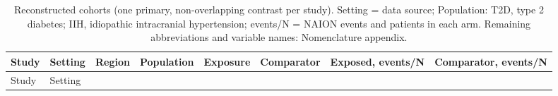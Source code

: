 \documentclass[
  11pt,
]{article}
\begin{document}
\begin{longtable}[]{@{}
  >{\raggedright\arraybackslash}p{}
  >{\raggedright\arraybackslash}p{}
  >{\raggedright\arraybackslash}p{}
  >{\raggedright\arraybackslash}p{}
  >{\raggedright\arraybackslash}p{}
  >{\raggedright\arraybackslash}p{}
  >{\raggedright\arraybackslash}p{}
  >{\raggedright\arraybackslash}p{}@{}}
\caption{Reconstructed cohorts (one primary, non-overlapping contrast
per study). Setting = data source; Population: T2D, type 2 diabetes;
IIH, idiopathic intracranial hypertension; events/N = NAION events and
patients in each arm. Remaining abbreviations and variable names:
Nomenclature appendix.}\tabularnewline
\toprule\noalign{}
\begin{minipage}[b]{\linewidth}\raggedright
Study
\end{minipage} & \begin{minipage}[b]{\linewidth}\raggedright
Setting
\end{minipage} & \begin{minipage}[b]{\linewidth}\raggedright
Region
\end{minipage} & \begin{minipage}[b]{\linewidth}\raggedright
Population
\end{minipage} & \begin{minipage}[b]{\linewidth}\raggedright
Exposure
\end{minipage} & \begin{minipage}[b]{\linewidth}\raggedright
Comparator
\end{minipage} & \begin{minipage}[b]{\linewidth}\raggedright
Exposed, events/N
\end{minipage} & \begin{minipage}[b]{\linewidth}\raggedright
Comparator, events/N
\end{minipage} \\
\midrule\noalign{}
\endfirsthead
\toprule\noalign{}
\begin{minipage}[b]{\linewidth}\raggedright
Study
\end{minipage} & \begin{minipage}[b]{\linewidth}\raggedright
Setting
\end{minipage} & \begin{minipage}[b]{\linewidth}\raggedright

\end{minipage}
\end{longtable}
\end{document}
